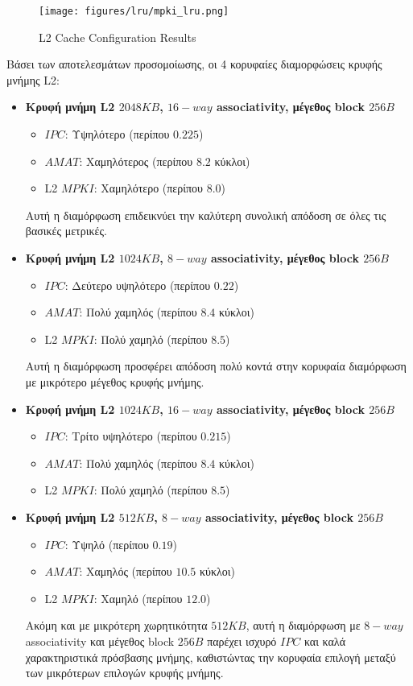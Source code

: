 \documentclass{article}
\begin{document}
\begin{figure}[H]
    \centering
    \texttt{[image: figures/lru/mpki\_lru.png]}
    \caption{L2 Cache Configuration Results}
    \label{fig:l2cache}
\end{figure}


Βάσει των αποτελεσμάτων προσομοίωσης, οι 4 κορυφαίες διαμορφώσεις κρυφής μνήμης L2:

\begin{itemize}
    \item \textbf{Κρυφή μνήμη L2 $2048KB$, $16-way$ associativity, μέγεθος block $256B$}
    \begin{itemize}
        \item $IPC$: Υψηλότερο (περίπου $0.225$)
        \item $AMAT$: Χαμηλότερος (περίπου $8.2$ κύκλοι)
        \item L2 $MPKI$: Χαμηλότερο (περίπου $8.0$)
    \end{itemize}
    Αυτή η διαμόρφωση επιδεικνύει την καλύτερη συνολική απόδοση σε όλες τις βασικές μετρικές.

    \item \textbf{Κρυφή μνήμη L2 $1024KB$, $8-way$ associativity, μέγεθος block $256B$}
    \begin{itemize}
        \item $IPC$: Δεύτερο υψηλότερο (περίπου $0.22$)
        \item $AMAT$: Πολύ χαμηλός (περίπου $8.4$ κύκλοι)
        \item L2 $MPKI$: Πολύ χαμηλό (περίπου $8.5$)
    \end{itemize}
    Αυτή η διαμόρφωση προσφέρει απόδοση πολύ κοντά στην κορυφαία διαμόρφωση με μικρότερο μέγεθος κρυφής μνήμης.

    \item \textbf{Κρυφή μνήμη L2 $1024KB$, $16-way$ associativity, μέγεθος block $256B$}
    \begin{itemize}
        \item $IPC$: Τρίτο υψηλότερο (περίπου $0.215$)
        \item $AMAT$: Πολύ χαμηλός (περίπου $8.4$ κύκλοι)
        \item L2 $MPKI$: Πολύ χαμηλό (περίπου $8.5$)
    \end{itemize}

    \item \textbf{Κρυφή μνήμη L2 $512KB$, $8-way$ associativity, μέγεθος block $256B$}
    \begin{itemize}
        \item $IPC$: Υψηλό (περίπου $0.19$)
        \item $AMAT$: Χαμηλός (περίπου $10.5$ κύκλοι)
        \item L2 $MPKI$: Χαμηλό (περίπου $12.0$)
    \end{itemize}
    Ακόμη και με μικρότερη χωρητικότητα $512KB$, αυτή η διαμόρφωση με $8-way$ associativity και μέγεθος block $256B$ παρέχει ισχυρό $IPC$ και καλά χαρακτηριστικά πρόσβασης μνήμης, καθιστώντας την κορυφαία επιλογή μεταξύ των μικρότερων επιλογών κρυφής μνήμης.
\end{itemize}
\end{document}

